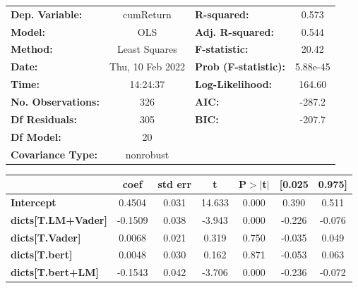 \begin{center}
\begin{tabular}{lclc}
\toprule
\textbf{Dep. Variable:}              &    cumReturn     & \textbf{  R-squared:         } &     0.573   \\
\textbf{Model:}                      &       OLS        & \textbf{  Adj. R-squared:    } &     0.544   \\
\textbf{Method:}                     &  Least Squares   & \textbf{  F-statistic:       } &     20.42   \\
\textbf{Date:}                       & Thu, 10 Feb 2022 & \textbf{  Prob (F-statistic):} &  5.88e-45   \\
\textbf{Time:}                       &     14:24:37     & \textbf{  Log-Likelihood:    } &    164.60   \\
\textbf{No. Observations:}           &         326      & \textbf{  AIC:               } &    -287.2   \\
\textbf{Df Residuals:}               &         305      & \textbf{  BIC:               } &    -207.7   \\
\textbf{Df Model:}                   &          20      & \textbf{                     } &             \\
\textbf{Covariance Type:}            &    nonrobust     & \textbf{                     } &             \\
\bottomrule
\end{tabular}
\begin{tabular}{lcccccc}
                                     & \textbf{coef} & \textbf{std err} & \textbf{t} & \textbf{P$> |$t$|$} & \textbf{[0.025} & \textbf{0.975]}  \\
\midrule
\textbf{Intercept}                   &       0.4504  &        0.031     &    14.633  &         0.000        &        0.390    &        0.511     \\
\textbf{dicts[T.LM+Vader]}           &      -0.1509  &        0.038     &    -3.943  &         0.000        &       -0.226    &       -0.076     \\
\textbf{dicts[T.Vader]}              &       0.0068  &        0.021     &     0.319  &         0.750        &       -0.035    &        0.049     \\
\textbf{dicts[T.bert]}               &       0.0048  &        0.030     &     0.162  &         0.871        &       -0.053    &        0.063     \\
\textbf{dicts[T.bert+LM]}            &      -0.1543  &        0.042     &    -3.706  &         0.000        &       -0.236    &       -0.072     \\

\end{tabular}
\end{center}
